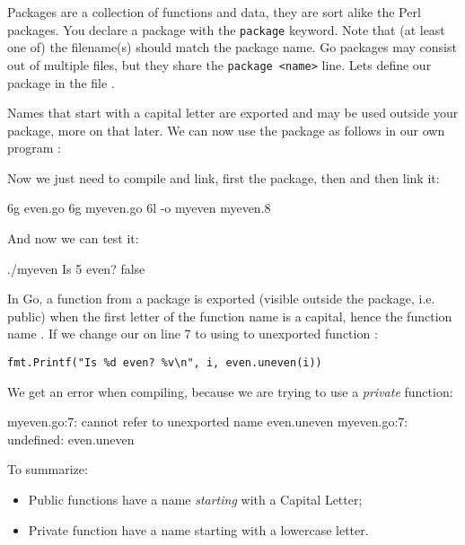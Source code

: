 \noindent{}Packages are a collection of functions and data, they are sort alike the
Perl packages\cite{perl-packages}. You declare a package with the
\lstinline{package} keyword. Note that (at least one of) the filename(s) should
match the package name. Go packages may consist out of multiple files,
but they share the \lstinline{package <name>} line.
Lets define our package  in the file .


Names that start with a capital letter are exported and may be used
outside your package, more on that later. We can now use
the package as follows in our own program :


Now we just need to compile and link, first the package, then  and
then link it:
\begin{display}
\pr 6g even.go			\qquad\qquad{}
\pr 6g myeven.go		\qquad\qquad{}
\pr 6l -o myeven myeven.8
\end{display}
And now we can test it:
\begin{display}
\pr ./myeven
Is 5 even? false
\end{display}

In Go, a function from a package is exported (visible
outside the package, i.e. public) when the first letter of the function name is a capital, hence
the function name . If we change our  on line
7 to using to unexported function :

\noindent\lstinline{fmt.Printf("Is %d even? %v\n", i, even.uneven(i))}

We get an error when compiling, because we are trying to use a
\emph{private} function:
\begin{display}
myeven.go:7: cannot refer to unexported name even.uneven
myeven.go:7: undefined: even.uneven
\end{display}
To summarize:
\begin{itemize}
\item Public functions have a name \emph{starting} with a Capital
Letter;
\item Private function have a name starting with a lowercase letter.
\end{itemize}


